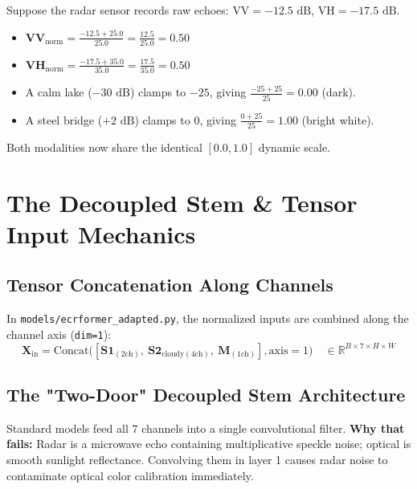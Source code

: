\documentclass[11pt,a4paper]{article}
\begin{document}
\begin{tcolorbox}[colback=secondary!5!white,colframe=secondary,title=\textbf{Worked Numerical Example: 1 Satellite Pixel},fonttitle=\bfseries]
Suppose the radar sensor records raw echoes: $\text{VV} = -12.5\text{ dB}$, $\text{VH} = -17.5\text{ dB}$.
\begin{itemize}[leftmargin=1.5em]
    \item $\mathbf{VV}_{\text{norm}} = \frac{-12.5 + 25.0}{25.0} = \frac{12.5}{25.0} = \mathbf{0.50}$
    \item $\mathbf{VH}_{\text{norm}} = \frac{-17.5 + 35.0}{35.0} = \frac{17.5}{35.0} = \mathbf{0.50}$
    \item A calm lake ($-30\text{ dB}$) clamps to $-25$, giving $\frac{-25+25}{25} = \mathbf{0.00}$ (dark).
    \item A steel bridge ($+2\text{ dB}$) clamps to $0$, giving $\frac{0+25}{25} = \mathbf{1.00}$ (bright white).
\end{itemize}
Both modalities now share the identical $[0.0, 1.0]$ dynamic scale.
\end{tcolorbox}

\section{The Decoupled Stem \& Tensor Input Mechanics}

\subsection{Tensor Concatenation Along Channels}
In \texttt{models/ecrformer\_adapted.py}, the normalized inputs are combined along the channel axis (\texttt{dim=1}):
\begin{equation}
\mathbf{X}_{\text{in}} = \text{Concat}\big([\mathbf{S1}_{(2\text{ch})},\ \mathbf{S2}_{\text{cloudy}(4\text{ch})},\ \mathbf{M}_{(1\text{ch})}], \text{axis}=1\big) \quad \in \mathbb{R}^{B \times 7 \times H \times W}
\end{equation}

\subsection{The "Two-Door" Decoupled Stem Architecture}
Standard models feed all 7 channels into a single convolutional filter. \textbf{Why that fails:} Radar is a microwave echo containing multiplicative speckle noise; optical is smooth sunlight reflectance. Convolving them in layer 1 causes radar noise to contaminate optical color calibration immediately.
\end{document}
